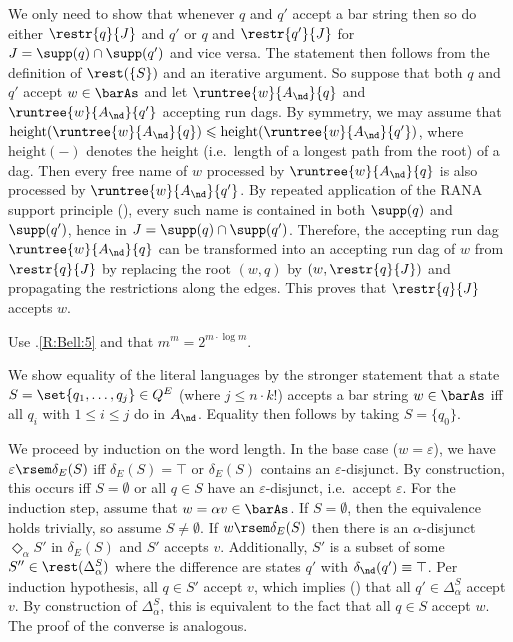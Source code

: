 \documentclass[10pt, final, conference, a4paper, twocolumn]{IEEEtran}
\begin{document}
\begin{IEEEproof}
  We only need to show that whenever $q$ and $q'$ accept a bar string then so
  do either $\restr{q}{J}$ and $q'$ or $q$ and $\restr{q'}{J}$ for $J = \supp(q) \cap \supp(q')$
  and vice versa. The statement then follows from the definition of $\rest(\{S\})$
  and an iterative argument. So suppose that both $q$ and $q'$ accept $w \in \barAs$ and let $\runtree{w}{A_{\nd}}{q}$ and $\runtree{w}{A_{\nd}}{q'}$ accepting run dags. By symmetry, we may assume that $\mathrm{height}(\runtree{w}{A_{\nd}}{q})\leqslant \mathrm{height}(\runtree{w}{A_{\nd}}{q'})$, where $\mathrm{height}(-)$ denotes the height (i.e.~length of a longest path from the root) of a dag. Then every free name of $w$ processed by $\runtree{w}{A_{\nd}}{q}$ is also processed by $\runtree{w}{A_{\nd}}{q'}$. By repeated application of the RANA support principle (), every such name is contained in both $\supp(q)$ and $\supp(q')$, hence in $J=\supp(q)\cap \supp(q')$. Therefore, the accepting run dag $\runtree{w}{A_{\nd}}{q}$ can be transformed into an accepting run dag of $w$ from $\restr{q}{J}$ by replacing the root $(w,q)$ by $(w,\restr{q}{J})$ and propagating the restrictions along the edges. This proves that $\restr{q}{J}$ accepts $w$. 
\end{IEEEproof}



\begin{IEEEproof}
Use .\ref{R:Bell:5} and that $m^m = 2^{m \cdot \log m}$.
\end{IEEEproof}

\begin{IEEEproof}
We show equality of the literal languages by the stronger statement that a state
$S = \set{q_1, \dots, q_j} \in Q^E$ (where $j \leqslant n \cdot k!$) accepts a bar string $w \in \barAs$
iff all $q_i$ with $1 \leqslant i \leqslant j$ do in $A_{\nd}$. Equality then follows by taking $S=\{q_0\}$.

We proceed by induction on the word length. In the base case
($w = \varepsilon$), we have $\varepsilon \rsem \delta_E(S)$ iff $\delta_E(S)=\top$ or $\delta_E(S)$ contains an $\varepsilon$-disjunct. By
construction, this occurs iff $S = \emptyset$ or all $q \in S$ have an $\varepsilon$-disjunct, i.e.~accept
$\varepsilon$. For the induction step, assume that $w = \alpha v \in \barAs$. If $S = \emptyset$, then the equivalence holds trivially,
so assume $S\neq \emptyset$.
If $w \rsem \delta_E(S)$ then there is an $\alpha$-disjunct $\Diamond_{\alpha} S'$
in $\delta_E(S)$ and $S'$ accepts $v$. Additionally, $S'$ is a subset of some $S'' \in \rest(\Delta_{\alpha}^S)$
where the difference are states $q'$ with $\delta_{\nd}(q') \equiv \top$. Per induction hypothesis, all $q \in S'$
accept $v$, which implies () that all $q' \in \Delta_{\alpha}^S$ accept $v$.
By construction of $\Delta_{\alpha}^S$, this is equivalent to the fact that all $q \in S$ accept $w$. The proof of the converse is analogous.    
\end{IEEEproof}
\end{document}
